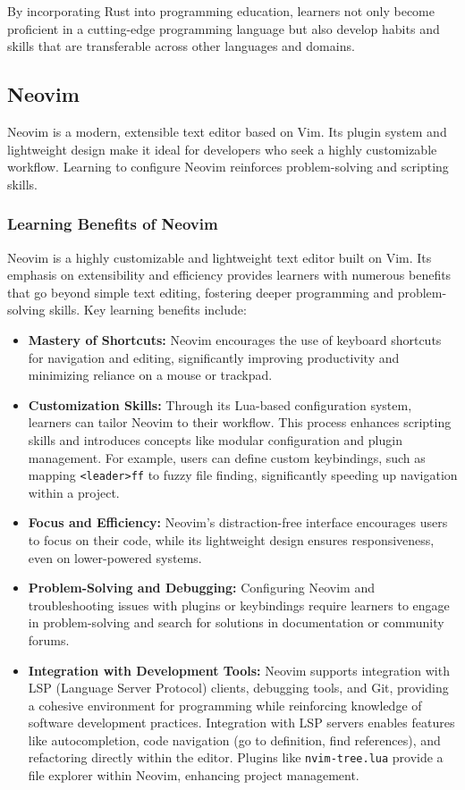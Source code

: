 \documentclass[12pt]{article}
\begin{document}
By incorporating Rust into programming education, learners not only become proficient in a cutting-edge programming language but also develop habits and skills that are transferable across other languages and domains.

\subsection{Neovim}

Neovim is a modern, extensible text editor based on Vim. Its plugin system and lightweight design make it ideal for developers who seek a highly customizable workflow. Learning to configure Neovim reinforces problem-solving and scripting skills.

\subsubsection{Learning Benefits of Neovim}

Neovim is a highly customizable and lightweight text editor built on Vim. Its emphasis on extensibility and efficiency provides learners with numerous benefits that go beyond simple text editing, fostering deeper programming and problem-solving skills. Key learning benefits include:

\begin{itemize}
    \item \textbf{Mastery of Shortcuts:} Neovim encourages the use of keyboard shortcuts for navigation and editing, significantly improving productivity and minimizing reliance on a mouse or trackpad.
    \item \textbf{Customization Skills:} Through its Lua-based configuration system, learners can tailor Neovim to their workflow. This process enhances scripting skills and introduces concepts like modular configuration and plugin management. For example, users can define custom keybindings, such as mapping \texttt{<leader>ff} to fuzzy file finding, significantly speeding up navigation within a project.
    \item \textbf{Focus and Efficiency:} Neovim’s distraction-free interface encourages users to focus on their code, while its lightweight design ensures responsiveness, even on lower-powered systems.
    \item \textbf{Problem-Solving and Debugging:} Configuring Neovim and troubleshooting issues with plugins or keybindings require learners to engage in problem-solving and search for solutions in documentation or community forums.
    \item \textbf{Integration with Development Tools:} Neovim supports integration with LSP (Language Server Protocol) clients, debugging tools, and Git, providing a cohesive environment for programming while reinforcing knowledge of software development practices. Integration with LSP servers enables features like autocompletion, code navigation (go to definition, find references), and refactoring directly within the editor. Plugins like \texttt{nvim-tree.lua} provide a file explorer within Neovim, enhancing project management.
\end{itemize}
\end{document}
